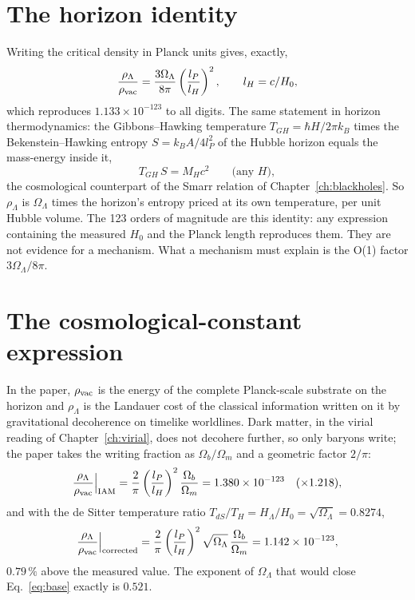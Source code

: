 \section{The horizon identity}
Writing the critical density in Planck units gives, exactly,
\begin{equation}\frac{\rho_\Lambda}{\rho_{\rm vac}}=\frac{3\Omega_\Lambda}{8\pi}\left(\frac{l_P}{l_H}\right)^2,\qquad l_H=c/H_0,\label{eq:ident}\end{equation}
which reproduces $1.133\times10^{-123}$ to all digits. The same statement in horizon thermodynamics: the Gibbons--Hawking temperature
$T_{GH}=\hbar H/2\pi k_B$ times the Bekenstein--Hawking entropy $S=k_BA/4l_P^2$ of the Hubble horizon equals the mass-energy inside it,
\begin{equation}T_{GH}\,S=M_Hc^2\qquad\text{(any }H),\end{equation}
the cosmological counterpart of the Smarr relation of Chapter~\ref{ch:blackholes}. So $\rho_\Lambda$ is $\Omega_\Lambda$ times the horizon's entropy
priced at its own temperature, per unit Hubble volume. The 123 orders of magnitude are this identity: any expression containing the measured
$H_0$ and the Planck length reproduces them. They are not evidence for a mechanism. What a mechanism must explain is the O(1) factor
$3\Omega_\Lambda/8\pi$.

\section{The cosmological-constant expression}
In the paper, $\rho_{\rm vac}$ is the energy of the complete Planck-scale substrate on the horizon and $\rho_\Lambda$ is the Landauer cost of the
classical information written on it by gravitational decoherence on timelike worldlines. Dark matter, in the virial reading of
Chapter~\ref{ch:virial}, does not decohere further, so only baryons write; the paper takes the writing fraction as $\Omega_b/\Omega_m$ and
a geometric factor $2/\pi$:
\begin{equation}\frac{\rho_\Lambda}{\rho_{\rm vac}}\Big|_{\rm IAM}=\frac{2}{\pi}\left(\frac{l_P}{l_H}\right)^2\frac{\Omega_b}{\Omega_m}
=1.380\times10^{-123}\quad(\times1.218),\label{eq:base}\end{equation}
and with the de Sitter temperature ratio $T_{dS}/T_H=H_\Lambda/H_0=\sqrt{\Omega_\Lambda}=0.8274$,
\begin{equation}\frac{\rho_\Lambda}{\rho_{\rm vac}}\Big|_{\rm corrected}=\frac{2}{\pi}\left(\frac{l_P}{l_H}\right)^2\sqrt{\Omega_\Lambda}\,
\frac{\Omega_b}{\Omega_m}=1.142\times10^{-123},\label{eq:corr}\end{equation}
$0.79\,\%$ above the measured value. The exponent of $\Omega_\Lambda$ that would close Eq.~\eqref{eq:base} exactly is $0.521$.

